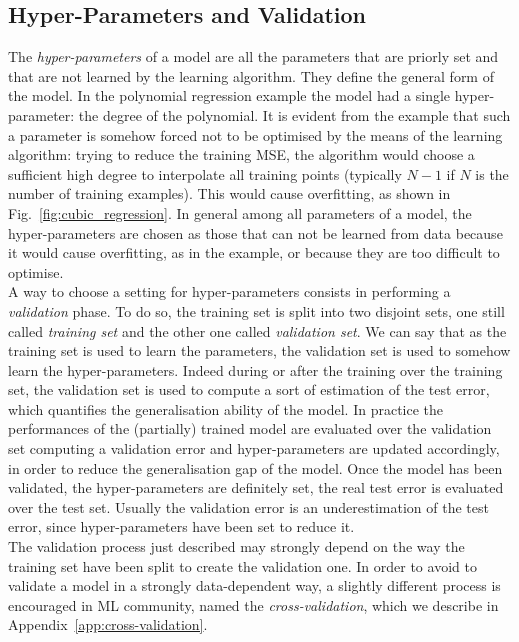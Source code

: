 \subsection{Hyper-Parameters and Validation}\label{sec:validation}
The \emph{hyper-parameters} of a model are all the parameters that are priorly set and that are not learned by the learning algorithm. They define the general form of the model. In the polynomial regression example the model had a single hyper-parameter: the degree of the polynomial. It is evident from the example that such a parameter is somehow forced not to be optimised by the means of the learning algorithm: trying to reduce the training MSE, the algorithm would choose a sufficient high degree to interpolate all training points (typically $N-1$ if $N$ is the number of training examples). This would cause overfitting, as shown in Fig.~\ref{fig:cubic_regression}. In general among all parameters of a model, the hyper-parameters are chosen as those that can not be learned from data because it would cause overfitting, as in the example, or because they are too difficult to optimise. \\
A way to choose a setting for hyper-parameters consists in performing a \emph{validation} phase. To do so, the training set is split into two disjoint sets, one still called \emph{training set} and the other one called \emph{validation set}. We can say that as the training set is used to learn the parameters, the validation set is used to somehow learn the hyper-parameters. Indeed during or after the training over the training set, the validation set is used to compute a sort of estimation of the test error, which quantifies the generalisation ability of the model. In practice the performances of the (partially) trained model are evaluated over the validation set computing a validation error and hyper-parameters are updated accordingly, in order to reduce the generalisation gap of the model. Once the model has been validated, \ie the hyper-parameters are definitely set, the real test error is evaluated over the test set. Usually the validation error is an underestimation of the test error, since hyper-parameters have been set to reduce it. \\
The validation process just described may strongly depend on the way the training set have been split to create the validation one. In order to avoid to validate a model in a strongly data-dependent way, a slightly different process is encouraged in ML community, named the \emph{cross-validation}, which we describe in Appendix~\ref{app:cross-validation}.



